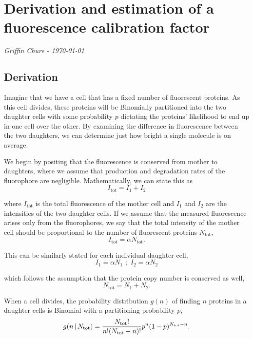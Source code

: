 \section*{Derivation and estimation of a fluorescence calibration factor}
\textit{Griffin Chure - \today}


\subsection*{Derivation}
Imagine that we have a cell that has a fixed number of fluorescent proteins.
As this cell divides, these proteins will be Binomially partitioned into the
two daughter cells with some probability $p$ dictating the proteins' likelihood
to end up in one cell over the other. By examining the difference in
fluorescence between the two daughters, we can determine just how bright a
single molecule is on average.

We begin by positing that the fluorescence is conserved from mother to
daughters, where we assume that production and degradation rates of the
fluorophore are negligible. Mathematically, we can state this as
\begin{equation}
I_\text{tot} = I_1 + I_2
\label{eq:fluo_cons}
\end{equation}

where $I_\text{tot}$ is the total fluorescence of the mother cell and $I_1$ and
$I_2$ are the intensities of the two daughter cells. If we assume that the
measured fluorescence arises only from the fluorophores, we say that the
total intensity of the mother cell should be proportional to the number of
fluorescent proteins $N_\text{tot}$,
\begin{equation}
I_\text{tot} = \alpha N_\text{tot}.
\label{eq:antot}
\end{equation}

This can be similarly stated for each individual daughter cell,
\begin{equation}
I_1 = \alpha N_1\,\, ; \,\, I_2 = \alpha N_2
\end{equation}

which follows the assumption that the protein copy number is conserved as well,
\begin{equation}
N_\text{tot} = N_1 + N_2.
\end{equation}

When a cell divides, the probability distribution $g(n)$  of finding $n$ proteins
in a daughter cells is Binomial with a partitioning probability $p$,
\begin{equation}
g(n \, \vert \, N_\text{tot}) = {N_\text{tot}! \over n! (N_\text{tot} - n)!} p^{n}(1 - p)^{N_\text{tot} - n}.
\label{eq:binomial}
\end{equation}

